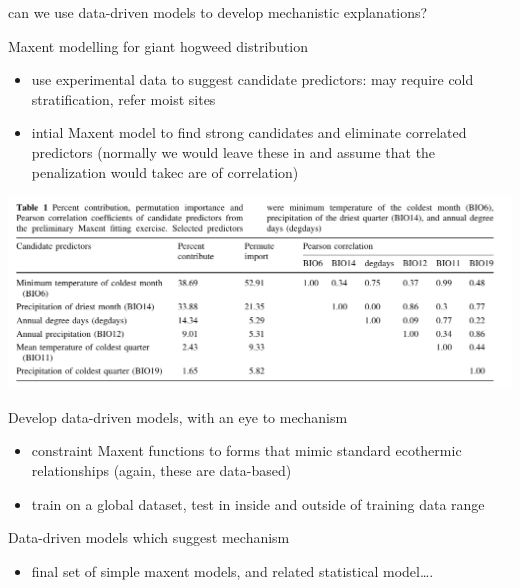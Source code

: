 \documentclass[
  ignorenonframetext,
]{beamer}
\providecommand{\tightlist}{%
  \setlength{\itemsep}{0pt}\setlength{\parskip}{0pt}}
\begin{document}
\begin{frame}{can we use data-driven models to develop mechanistic
explanations?}
\begin{block}{Maxent modelling for giant hogweed distribution}
\protect\hypertarget{maxent-modelling-for-giant-hogweed-distribution}{}
\begin{itemize}
\item
  use experimental data to suggest candidate predictors: may require
  cold stratification, refer moist sites
\item
  intial Maxent model to find strong candidates and eliminate correlated
  predictors (normally we would leave these in and assume that the
  penalization would takec are of correlation)
\end{itemize}

\begin{center}\includegraphics[width=1\linewidth]{tblehogweed} \end{center}
\end{block}

\begin{block}{Develop data-driven models, with an eye to mechanism}
\protect\hypertarget{develop-data-driven-models-with-an-eye-to-mechanism}{}
\begin{itemize}
\tightlist
\item
  constraint Maxent functions to forms that mimic standard ecothermic
  relationships (again, these are data-based)
\item
  train on a global dataset, test in inside and outside of training data
  range
\end{itemize}
\end{block}

\begin{block}{Data-driven models which suggest mechanism}
\protect\hypertarget{margins}{}
\begin{itemize}
\tightlist
\item
  final set of simple maxent models, and related statistical
  model\ldots.
\end{itemize}


\end{block}
\end{frame}
\end{document}
